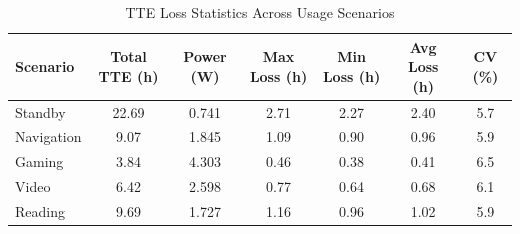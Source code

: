 \begin{table}[htbp]
\centering
\caption{TTE Loss Statistics Across Usage Scenarios}
\label{tab:tte_loss_summary}
\begin{tabular}{lcccccc}
\hline
Scenario & Total TTE (h) & Power (W) & Max Loss (h) & Min Loss (h) & Avg Loss (h) & CV (\%) \\
\hline
Standby & 22.69 & 0.741 & 2.71 & 2.27 & 2.40 & 5.7 \\
Navigation & 9.07 & 1.845 & 1.09 & 0.90 & 0.96 & 5.9 \\
Gaming & 3.84 & 4.303 & 0.46 & 0.38 & 0.41 & 6.5 \\
Video & 6.42 & 2.598 & 0.77 & 0.64 & 0.68 & 6.1 \\
Reading & 9.69 & 1.727 & 1.16 & 0.96 & 1.02 & 5.9 \\
\hline
\end{tabular}
\end{table}
